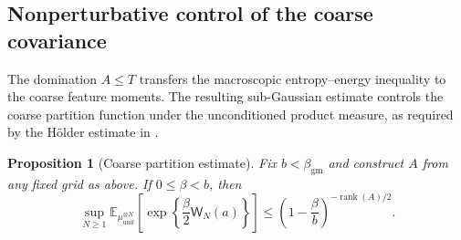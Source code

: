 \documentclass[11pt,reqno]{amsart}
\numberwithin{equation}{section}
\theoremstyle{plain}
\newtheorem{prop}[prop]{Proposition}
\theoremstyle{definition}
\newcommand{\E}{\mathbb E}
\newcommand{\rank}{\operatorname{rank}}
\newcommand{\be}{\beta}
\newcommand{\muunif}{\mu_{\mathrm{unif}}}
\newcommand{\gm}{\mathrm{gm}}
\begin{document}
\subsection{Nonperturbative control of the coarse covariance}
\label{subsec:coarse-control}

The domination $A\leq T$ transfers the macroscopic entropy--energy inequality to the coarse feature moments. The resulting sub-Gaussian estimate controls the coarse partition function under the unconditioned product measure, as required by the H\"older estimate in .

\begin{prop}[Coarse partition estimate]
\label{prop:coarse-partition-estimate}
Fix \(b<\beta_{\gm}\) and construct \(A\) from any fixed grid as above.  If \(0\leq\be<b\), then
\begin{equation}
 \sup_{N\geq1}
 \E_{\muunif^{\otimes N}}\left[
 \exp\left\{\frac\be2\mathsf W_N(a)\right\}\right]
 \leq\left(1-\frac\be b\right)^{-\rank(A)/2}.
 \label{eq:coarse-partition-estimate}
\end{equation}
\end{prop}
\end{document}
